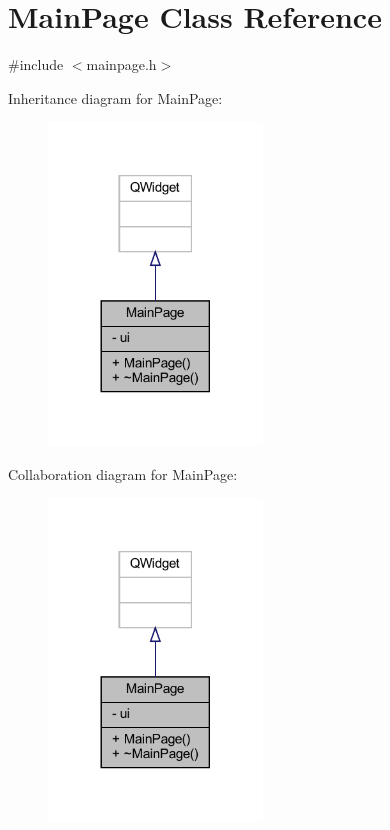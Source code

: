 \hypertarget{class_main_page}{}\section{Main\+Page Class Reference}
\label{class_main_page}


{\ttfamily \#include $<$mainpage.\+h$>$}



Inheritance diagram for Main\+Page\+:
\nopagebreak
\begin{figure}[H]
\begin{center}
\leavevmode
\includegraphics[width=161pt]{class_main_page__inherit__graph}
\end{center}
\end{figure}


Collaboration diagram for Main\+Page\+:
\nopagebreak
\begin{figure}[H]
\begin{center}
\leavevmode
\includegraphics[width=161pt]{class_main_page__coll__graph}
\end{center}
\end{figure}
